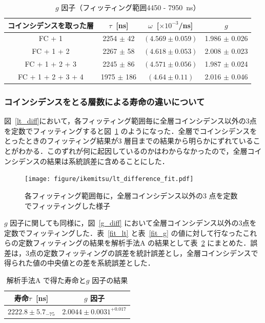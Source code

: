 \begin{table}[H]
\caption{$g$ 因子（フィッティング範囲4450 - 7950~ns） }
\label{fitrange4}
\centering
\begin{tabular}{cccc}\toprule
コインシデンスを取った層 & $\tau$~[ns] & $\omega$~[$\times 10^{-3}$/ns] & $g$ \\ \midrule
FC + 1 & 2254 $\pm$ 42 & $(4.569 \pm 0.059) $ & 1.986 $\pm$ 0.026 \\
FC + 1 + 2 & 2267 $\pm$ 58 & $(4.618 \pm 0.053) $ & 2.008 $\pm$ 0.023 \\
FC + 1 + 2 + 3 & 2245 $\pm$ 86 & $(4.571 \pm 0.056) $ & 1.987 $\pm$ 0.024\\
FC + 1 + 2 + 3 + 4 & 1975 $\pm$ 186& $(4.64 \pm 0.11) $ & 2.016 $\pm$ 0.046 \\ \bottomrule
\end{tabular}
\end{table}%

\subsubsection{コインシデンスをとる層数による寿命の違いについて}
図~\ref{lt_diff}において，各フィッティング範囲毎に全層コインシデンス以外の3点を定数でフィッティングすると図~\ref{lt_diff_fit} のようになった．全層でコインシデンスをとったときのフィッティング結果が3 層目までの結果から明らかにずれていることがわかる．このずれが何に起因しているのかはわからなかったので，全層コインシデンスの結果は系統誤差に含めることにした．

\begin{figure}[H]
\centering
\texttt{[image: figure/ikemitsu/lt\_difference\_fit.pdf]}
\caption{各フィッティング範囲毎に，全層コインシデンス以外の3 点を定数でフィッティングした様子}
\label{lt_diff_fit}
\end{figure}

$g$ 因子に関しても同様に，図~\ref{g_diff} において全層コインシデンス以外の3点を定数でフィッティングした．表~\ref{fit_lt} と表~\ref{fit_g} の値に対して行なったこれらの定数フィッティングの結果を解析手法A の結果として表~\ref{kaisekiA_matome} にまとめた．誤差は，3点の定数フィッティングの誤差を統計誤差とし，全層コインシデンスで得られた値の中央値との差を系統誤差とした．

\begin{table}[H]
\caption{解析手法A で得た寿命と$g$ 因子の結果}
\label{kaisekiA_matome}
\centering
\begin{tabular}{cc}\toprule
寿命$\tau$~[ns] & $g$ 因子 \\ \midrule
$2222.8\pm5.7 _{-75}$ & $2.0044\pm 0.0031^{+0.017}$ \\ \bottomrule
\end{tabular}
\end{table}
  

